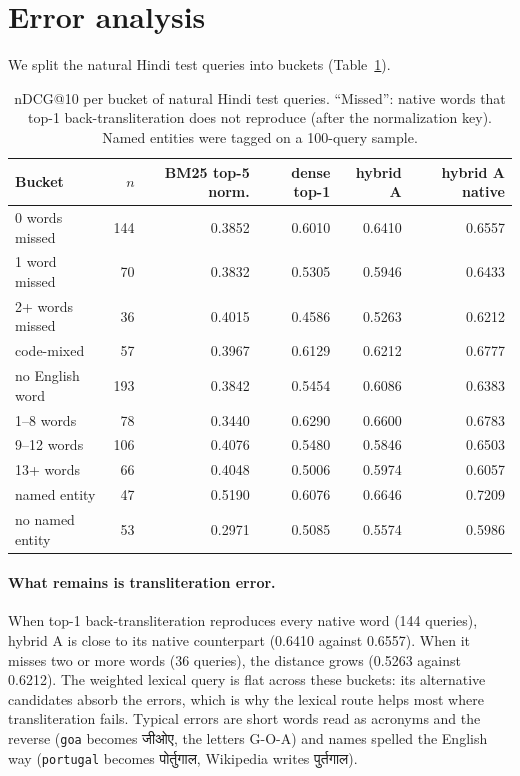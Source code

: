 \documentclass[11pt,a4paper]{article}
\newcommand{\dev}[1]{{\devfont #1}}
\newcommand{\rom}[1]{\texttt{#1}}          %
\begin{document}
\section{Error analysis}

We split the natural Hindi test queries into buckets (Table~\ref{tab:buckets}).

\begin{table}[H]
\centering
\caption{nDCG@10 per bucket of natural Hindi test queries. ``Missed'': native words that
top-1 back-transliteration does not reproduce (after the normalization key). Named entities
were tagged on a 100-query sample.}
\label{tab:buckets}
\small
\begin{tabular}{lrrrrr}
\toprule
Bucket & $n$ & BM25 top-5 norm. & dense top-1 & hybrid A & hybrid A native \\
\midrule
0 words missed   & 144 & 0.3852 & 0.6010 & 0.6410 & 0.6557 \\
1 word missed    & 70  & 0.3832 & 0.5305 & 0.5946 & 0.6433 \\
2+ words missed  & 36  & 0.4015 & 0.4586 & 0.5263 & 0.6212 \\
\midrule
code-mixed       & 57  & 0.3967 & 0.6129 & 0.6212 & 0.6777 \\
no English word  & 193 & 0.3842 & 0.5454 & 0.6086 & 0.6383 \\
\midrule
1--8 words       & 78  & 0.3440 & 0.6290 & 0.6600 & 0.6783 \\
9--12 words      & 106 & 0.4076 & 0.5480 & 0.5846 & 0.6503 \\
13+ words        & 66  & 0.4048 & 0.5006 & 0.5974 & 0.6057 \\
\midrule
named entity     & 47  & 0.5190 & 0.6076 & 0.6646 & 0.7209 \\
no named entity  & 53  & 0.2971 & 0.5085 & 0.5574 & 0.5986 \\
\bottomrule
\end{tabular}
\end{table}

\paragraph{What remains is transliteration error.} When top-1 back-transliteration
reproduces every native word (144 queries), hybrid A is close to its native counterpart
(0.6410 against 0.6557). When it misses two or more words (36 queries), the distance grows
(0.5263 against 0.6212). The weighted lexical query is flat across these buckets: its
alternative candidates absorb the errors, which is why the lexical route helps most where
transliteration fails. Typical errors are short words read as acronyms and the reverse
(\rom{goa} becomes \dev{जीओए}, the letters G-O-A) and names spelled the English way
(\rom{portugal} becomes \dev{पोर्तुगाल}, Wikipedia writes \dev{पुर्तगाल}).
\end{document}
